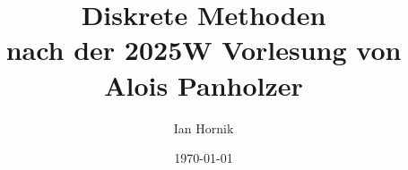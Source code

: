 \documentclass[letterpaper, 12pt]{article}
\newcommand{\1}{\mathds{1}}
\theoremstyle{definition}
\begin{document}
\title{Diskrete Methoden \\[0.3em]
\normalsize nach der 2025W Vorlesung von Alois Panholzer}



\author{\normalsize Ian Hornik}
\date{\vspace{-0.8em}\normalsize\today}



\maketitle
\tableofcontents\label{sec:contents}




\end{document}
